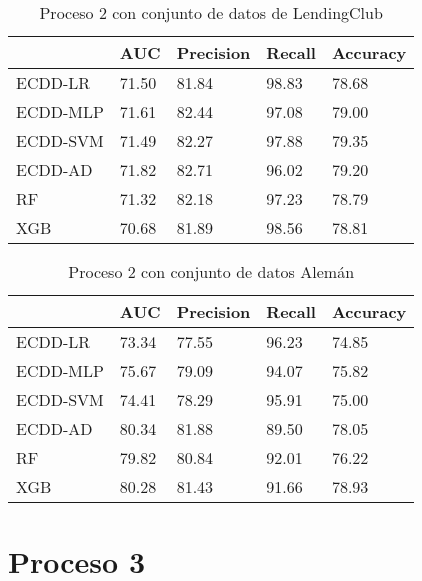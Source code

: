 \begin{table}[]
\centering
\caption{Proceso 2 con conjunto de datos de LendingClub}
\label{tab:lc-proc2}
\begin{tabularx}{0.75\textwidth}{|l|Y Y Y Y|}
                \hline
                & AUC       & Precision & Recall    & Accuracy  \\
                \hline
ECDD-LR           & 71.50     & 81.84     & 98.83     & 78.68     \\
ECDD-MLP          & 71.61     & 82.44     & 97.08     & 79.00     \\
ECDD-SVM          & 71.49     & 82.27     & 97.88     & 79.35     \\
ECDD-AD           & 71.82     & 82.71     & 96.02     & 79.20     \\
                \hline
RF              & 71.32     & 82.18     & 97.23     & 78.79     \\
XGB             & 70.68     & 81.89     & 98.56     & 78.81     \\
                \hline
\end{tabularx}
\end{table}


\begin{table}[]
\centering
\caption{Proceso 2 con conjunto de datos Alemán}
\label{tab:german-proc2}
\begin{tabularx}{0.75\textwidth}{|l|Y Y Y Y|}
                \hline
                & AUC       & Precision & Recall    & Accuracy  \\
                \hline
ECDD-LR           & 73.34     & 77.55     & 96.23     & 74.85     \\
ECDD-MLP          & 75.67     & 79.09     & 94.07     & 75.82     \\
ECDD-SVM          & 74.41     & 78.29     & 95.91     & 75.00     \\
ECDD-AD           & 80.34     & 81.88     & 89.50     & 78.05     \\
                \hline
RF              & 79.82     & 80.84     & 92.01     & 76.22     \\
XGB             & 80.28     & 81.43     & 91.66     & 78.93     \\
                \hline
\end{tabularx}
\end{table}


\section{Proceso 3} %

